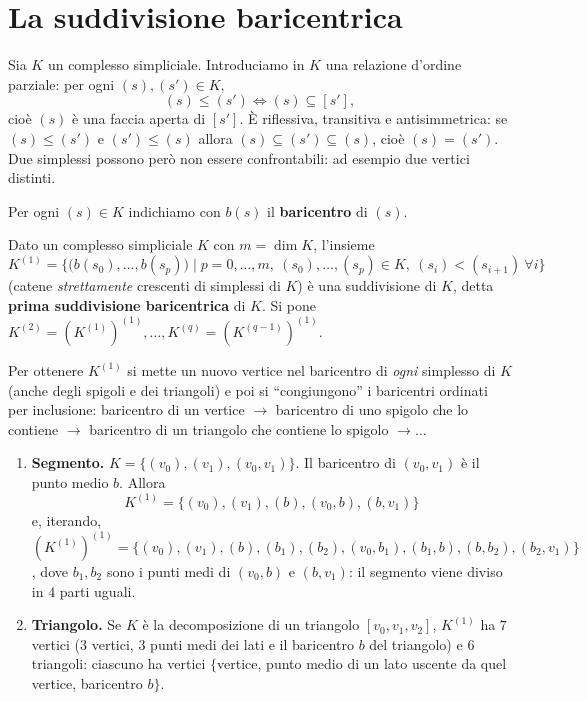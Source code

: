 \section{La suddivisione baricentrica}

\begin{definicion}
Sia $K$ un complesso simpliciale. Introduciamo in $K$ una relazione d'ordine parziale: per ogni $(s), (s') \in K$,
\[
(s) \leqslant (s') \iff (s) \subseteq [s'],
\]
cio\`e $(s)$ \`e una faccia aperta di $[s']$. \`E riflessiva, transitiva e antisimmetrica: se $(s) \leqslant (s')$ e $(s') \leqslant (s)$ allora $(s) \subseteq (s') \subseteq (s)$, cio\`e $(s) = (s')$. Due simplessi possono per\`o non essere confrontabili: ad esempio due vertici distinti.
\end{definicion}

Per ogni $(s) \in K$ indichiamo con $b(s)$ il \textbf{baricentro} di $(s)$.

\begin{teo}
Dato un complesso simpliciale $K$ con $m = \dim K$, l'insieme
\[
K^{(1)} = \Big\{ \big( b(s_0), \dots, b(s_p) \big) \;\Big|\; p = 0, \dots, m,\ (s_0), \dots, (s_p) \in K,\ (s_i) < (s_{i+1})\ \forall i \Big\}
\]
(catene \emph{strettamente} crescenti di simplessi di $K$) \`e una suddivisione di $K$, detta \textbf{prima suddivisione baricentrica} di $K$. Si pone $K^{(2)} = (K^{(1)})^{(1)}, \dots, K^{(q)} = (K^{(q-1)})^{(1)}$.
\end{teo}

\begin{intuizione}
Per ottenere $K^{(1)}$ si mette un nuovo vertice nel baricentro di \emph{ogni} simplesso di $K$ (anche degli spigoli e dei triangoli) e poi si ``congiungono'' i baricentri ordinati per inclusione: baricentro di un vertice $\to$ baricentro di uno spigolo che lo contiene $\to$ baricentro di un triangolo che contiene lo spigolo $\to \dots$
\end{intuizione}

\begin{ejemplo}
\begin{enumerate}
    \item \textbf{Segmento.} $K = \{ (v_0), (v_1), (v_0, v_1) \}$. Il baricentro di $(v_0, v_1)$ \`e il punto medio $b$. Allora
    \[
    K^{(1)} = \{ (v_0), (v_1), (b), (v_0, b), (b, v_1) \}
    \]
    e, iterando, $(K^{(1)})^{(1)} = \{ (v_0), (v_1), (b), (b_1), (b_2), (v_0, b_1), (b_1, b), (b, b_2), (b_2, v_1) \}$, dove $b_1, b_2$ sono i punti medi di $(v_0, b)$ e $(b, v_1)$: il segmento viene diviso in $4$ parti uguali.
    \item \textbf{Triangolo.} Se $K$ \`e la decomposizione di un triangolo $[v_0, v_1, v_2]$, $K^{(1)}$ ha $7$ vertici ($3$ vertici, $3$ punti medi dei lati e il baricentro $b$ del triangolo) e $6$ triangoli: ciascuno ha vertici $\{$vertice, punto medio di un lato uscente da quel vertice, baricentro $b\}$.
\end{enumerate}
\end{ejemplo}

